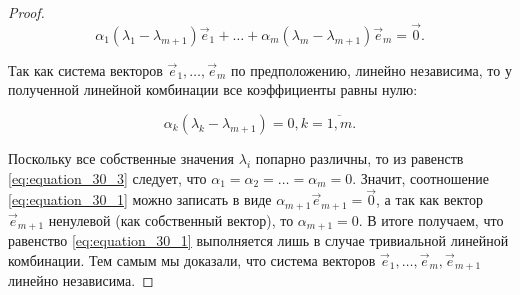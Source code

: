 \begin{proof}
    $$\alpha_1(\lambda_1 - \lambda_{m + 1})\vec{e}_1 + \ldots + \alpha_m(\lambda_m - \lambda_{m + 1})\vec{e}_m = \vec{0}.$$

    Так как система векторов $\vec{e}_1, \ldots, \vec{e}_m$ по предположению, линейно независима, то у полученной линейной комбинации все коэффициенты равны нулю:

    \begin{equation}
        \alpha_k(\lambda_k - \lambda_{m + 1}) = 0, k = \overline{1, m}.
        \label{eq:equation_30_3}
    \end{equation}

    Поскольку все собственные значения $\lambda_i$ попарно различны, то из равенств \eqref{eq:equation_30_3} следует, что $\alpha_1 = \alpha_2 = \ldots = \alpha_m = 0$. Значит, соотношение \eqref{eq:equation_30_1} можно записать в виде $\alpha_{m + 1}\vec{e}_{m + 1} = \vec{0}$, а так как вектор $\vec{e}_{m + 1}$ ненулевой (как собственный вектор), то $\alpha_{m + 1} = 0$. В итоге получаем, что равенство \eqref{eq:equation_30_1} выполняется лишь в случае тривиальной линейной комбинации. Тем самым мы доказали, что система векторов $\vec{e}_1, \ldots, \vec{e}_m, \vec{e}_{m + 1}$ линейно независима.
\end{proof}

